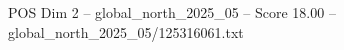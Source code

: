 \begin{textsample}{POS Dim 2 – global\_north\_2025\_05 – Score 18.00 – global\_north\_2025\_05/125316061.txt}
\end{textsample}
